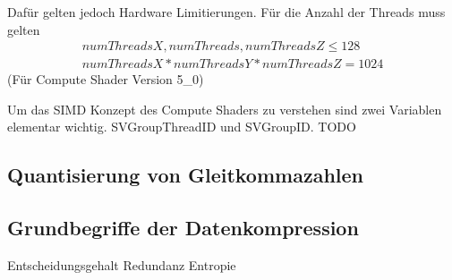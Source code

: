 Dafür gelten jedoch Hardware Limitierungen.
Für die Anzahl der Threads muss gelten
\begin{gather*}
	numThreadsX, numThreads, numThreadsZ \leq 128 \\
	numThreadsX * numThreadsY * numThreadsZ = 1024
\end{gather*}
(Für Compute Shader Version 5\_0)

Um das SIMD Konzept des Compute Shaders zu verstehen sind zwei Variablen elementar wichtig.
SVGroupThreadID und SVGroupID.
TODO

\subsection{Quantisierung von Gleitkommazahlen}
\label{subsec:quantisierung}


\subsection{Grundbegriffe der Datenkompression}
\label{subsec:grundbegriffe_datenkompression}

Entscheidungsgehalt
Redundanz
Entropie
